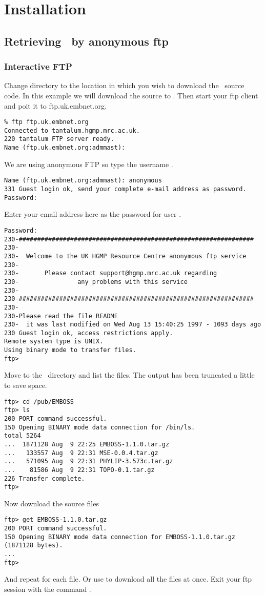 \documentclass{report}
\begin{document}
\chapter{Installation}
\section{Retrieving \EMBOSS\ by anonymous ftp}
\subsection{Interactive FTP}

Change directory to the location in which you wish to download the \EMBOSS\ source code. In this example we will download the source to . Then start your ftp client and poit it to ftp.uk.embnet.org.
\begin{verbatim}
% ftp ftp.uk.embnet.org
Connected to tantalum.hgmp.mrc.ac.uk.
220 tantalum FTP server ready.
Name (ftp.uk.embnet.org:admmast):
\end{verbatim}
We are using anonymous FTP so type the username .
\begin{verbatim}
Name (ftp.uk.embnet.org:admmast): anonymous
331 Guest login ok, send your complete e-mail address as password.
Password:
\end{verbatim}
Enter your email address here as the password for user .
\begin{verbatim}
Password:
230-################################################################
230-
230-  Welcome to the UK HGMP Resource Centre anonymous ftp service
230-
230-       Please contact support@hgmp.mrc.ac.uk regarding
230-                any problems with this service
230-
230-################################################################
230-
230-Please read the file README
230-  it was last modified on Wed Aug 13 15:40:25 1997 - 1093 days ago
230 Guest login ok, access restrictions apply.
Remote system type is UNIX.
Using binary mode to transfer files.
ftp>
\end{verbatim}
Move to the \EMBOSS\ directory and list the files. The output has been truncated a little to save space.
\begin{verbatim}
ftp> cd /pub/EMBOSS
ftp> ls
200 PORT command successful.
150 Opening BINARY mode data connection for /bin/ls.
total 5264
...  1871128 Aug  9 22:25 EMBOSS-1.1.0.tar.gz
...   133557 Aug  9 22:31 MSE-0.0.4.tar.gz
...   571095 Aug  9 22:31 PHYLIP-3.573c.tar.gz
...    81586 Aug  9 22:31 TOPO-0.1.tar.gz
226 Transfer complete.
ftp>
\end{verbatim}
Now download the source files
\begin{verbatim}
ftp> get EMBOSS-1.1.0.tar.gz
200 PORT command successful.
150 Opening BINARY mode data connection for EMBOSS-1.1.0.tar.gz 
(1871128 bytes).
...
ftp>
\end{verbatim}
And repeat for each file. Or use  to download all the files at once.
Exit your ftp session with the command .
\end{document}
